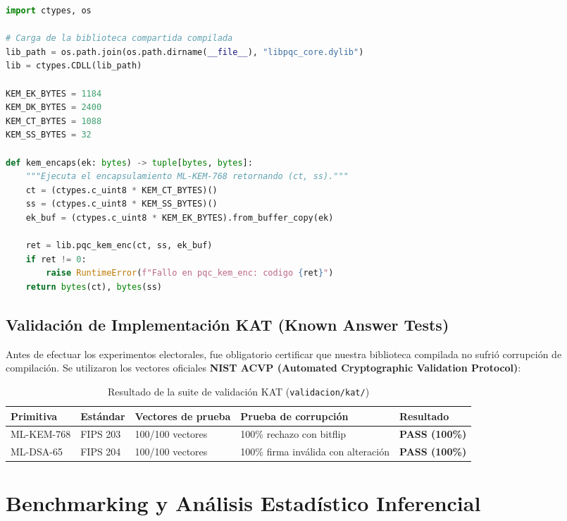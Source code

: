 \documentclass[11pt,a4paper,twoside,openright]{book}
\theoremstyle{plain}
\theoremstyle{definition}
\theoremstyle{remark}
\begin{document}
\begin{lstlisting}[language=Python, caption={Extracci\'on representativa de pqc\_wrapper.py}]
import ctypes, os

# Carga de la biblioteca compartida compilada
lib_path = os.path.join(os.path.dirname(__file__), "libpqc_core.dylib")
lib = ctypes.CDLL(lib_path)

KEM_EK_BYTES = 1184
KEM_DK_BYTES = 2400
KEM_CT_BYTES = 1088
KEM_SS_BYTES = 32

def kem_encaps(ek: bytes) -> tuple[bytes, bytes]:
    """Ejecuta el encapsulamiento ML-KEM-768 retornando (ct, ss)."""
    ct = (ctypes.c_uint8 * KEM_CT_BYTES)()
    ss = (ctypes.c_uint8 * KEM_SS_BYTES)()
    ek_buf = (ctypes.c_uint8 * KEM_EK_BYTES).from_buffer_copy(ek)
    
    ret = lib.pqc_kem_enc(ct, ss, ek_buf)
    if ret != 0:
        raise RuntimeError(f"Fallo en pqc_kem_enc: codigo {ret}")
    return bytes(ct), bytes(ss)
\end{lstlisting}

\section{Validaci\'on de Implementaci\'on KAT (Known Answer Tests)}

Antes de efectuar los experimentos electorales, fue obligatorio certificar que nuestra biblioteca compilada no sufri\'o corrupci\'on de compilaci\'on. Se utilizaron los vectores oficiales \textbf{NIST ACVP (Automated Cryptographic Validation Protocol)}:

\begin{table}[H]
\centering
\caption{Resultado de la suite de validaci\'on KAT (\texttt{validacion/kat/})}
\label{tab:kat_results}
\begin{tabular}{lllll}
\toprule
\textbf{Primitiva} & \textbf{Est\'andar} & \textbf{Vectores de prueba} & \textbf{Prueba de corrupci\'on} & \textbf{Resultado} \\
\midrule
ML-KEM-768 & FIPS 203 & 100/100 vectores & 100\% rechazo con bitflip & \textbf{PASS (100\%)} \\
ML-DSA-65  & FIPS 204 & 100/100 vectores & 100\% firma inv\'alida con alteraci\'on & \textbf{PASS (100\%)} \\
\bottomrule
\end{tabular}
\end{table}

\chapter{Benchmarking y An\'alisis Estad\'istico Inferencial}
\label{chap:benchmarking_estadistico}
\end{document}
